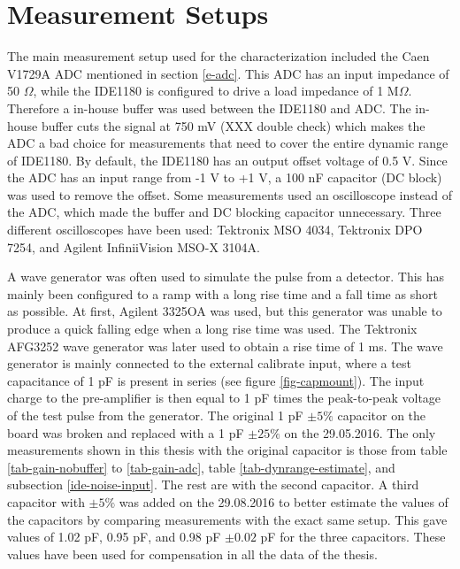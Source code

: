 \documentclass[../main/thesis.tex]{subfiles}
\begin{document}
\section{Measurement Setups}
\label{ide-setup}

The main measurement setup used for the characterization included the Caen V1729A \gls{ADC} mentioned in section \ref{e-adc}. This \gls{ADC} has an input impedance of 50 $\Omega$, while the IDE1180 is configured to drive a load impedance of 1 M$\Omega$. Therefore a in-house buffer was used between the IDE1180 and ADC. The in-house buffer cuts the signal at 750 mV (XXX double check) which makes the \gls{ADC} a bad choice for measurements that need to cover the entire dynamic range of IDE1180. By default, the IDE1180 has an output offset voltage of 0.5 V. Since the ADC has an input range from -1 V to +1 V, a 100 nF capacitor (DC block) was used to remove the offset. Some measurements used an oscilloscope instead of the ADC, which made the buffer and DC blocking capacitor unnecessary. Three different oscilloscopes have been used: Tektronix MSO 4034, Tektronix DPO 7254, and Agilent InfiniiVision MSO-X 3104A. 

A wave generator was often used to simulate the pulse from a detector. This has mainly been configured to a ramp with a long rise time and a fall time as short as possible. At first, Agilent 3325OA was used, but this generator was unable to produce a quick falling edge when a long rise time was used. The Tektronix AFG3252 wave generator was later used to obtain a rise time of 1 ms. The wave generator is mainly connected to the external calibrate input, where a test capacitance of 1 pF is present in series (see figure \ref{fig-capmount}). The input charge to the pre-amplifier is then equal to 1 pF times the peak-to-peak voltage of the test pulse from the generator. The original 1 pF $\pm5\%$ capacitor on the board was broken and replaced with a 1 pF $\pm25\%$ on the 29.05.2016. The only measurements shown in this thesis with the original capacitor is those from table \ref{tab-gain-nobuffer} to \ref{tab-gain-adc}, table \ref{tab-dynrange-estimate}, and subsection \ref{ide-noise-input}. The rest are with the second capacitor. A third capacitor with $\pm5\%$ was added on the 29.08.2016 to better estimate the values of the capacitors by comparing measurements with the exact same setup. This gave values of 1.02 pF, 0.95 pF, and 0.98 pF $\pm0.02$ pF for the three capacitors. These values have been used for compensation in all the data of the thesis.
\end{document}
